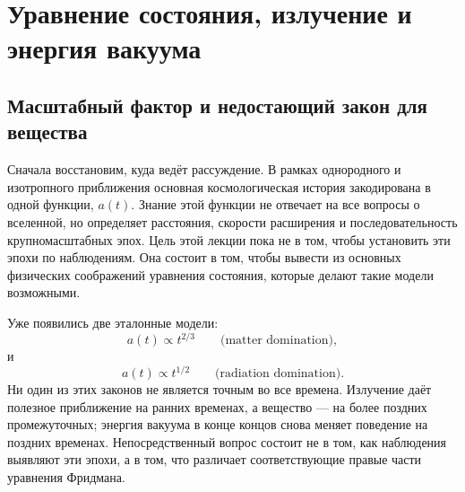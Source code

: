 \chapter{Уравнение состояния, излучение и энергия вакуума}


\section{Масштабный фактор и недостающий закон для вещества}

Сначала восстановим, куда ведёт рассуждение. В рамках однородного и изотропного приближения основная космологическая история закодирована в одной функции, \(a(t)\). Знание этой функции не отвечает на все вопросы о вселенной, но определяет расстояния, скорости расширения и последовательность крупномасштабных эпох. Цель этой лекции пока не в том, чтобы установить эти эпохи по наблюдениям. Она состоит в том, чтобы вывести из основных физических соображений уравнения состояния, которые делают такие модели возможными.

Уже появились две эталонные модели:
\begin{equation}
a(t)\propto t^{2/3}
\qquad\text{(matter domination)},
\end{equation}
и
\begin{equation}
a(t)\propto t^{1/2}
\qquad\text{(radiation domination)}.
\end{equation}
Ни один из этих законов не является точным во все времена. Излучение даёт полезное приближение на ранних временах, а вещество — на более поздних промежуточных; энергия вакуума в конце концов снова меняет поведение на поздних временах. Непосредственный вопрос состоит не в том, как наблюдения выявляют эти эпохи, а в том, что различает соответствующие правые части уравнения Фридмана.


